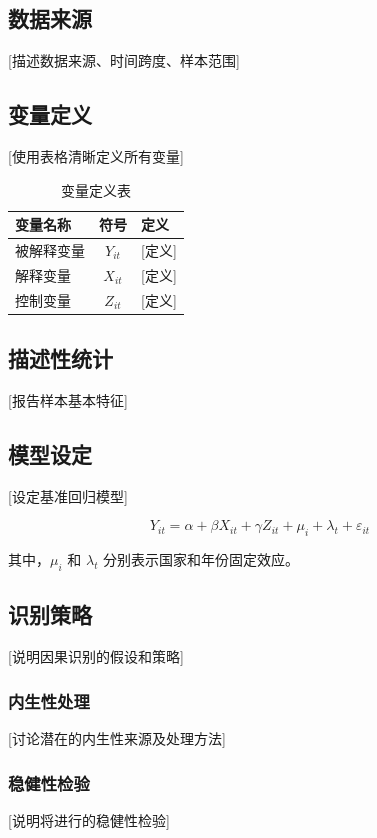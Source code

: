 \documentclass[a4paper,12pt]{article}
\numberwithin{equation}{section}
\begin{document}
\subsection{数据来源}
[描述数据来源、时间跨度、样本范围]

\subsection{变量定义}
[使用表格清晰定义所有变量]

\begin{table}[htbp]
\caption{变量定义表}
\label{tab:var_def}
\centering
\begin{tabular}{lcl}
\toprule
变量名称 & 符号 & 定义 \\
\midrule
被解释变量 & $Y_{it}$ & [定义] \\
解释变量 & $X_{it}$ & [定义] \\
控制变量 & $Z_{it}$ & [定义] \\
\bottomrule
\end{tabular}
\end{table}

\subsection{描述性统计}
[报告样本基本特征]

\subsection{模型设定}
[设定基准回归模型]

\begin{equation}
\label{eq:baseline}
Y_{it} = \alpha + \beta X_{it} + \gamma Z_{it} + \mu_i + \lambda_t + \varepsilon_{it}
\end{equation}

其中，$\mu_i$ 和 $\lambda_t$ 分别表示国家和年份固定效应。

\subsection{识别策略}
[说明因果识别的假设和策略]

\subsubsection{内生性处理}
[讨论潜在的内生性来源及处理方法]

\subsubsection{稳健性检验}
[说明将进行的稳健性检验]
\end{document}
